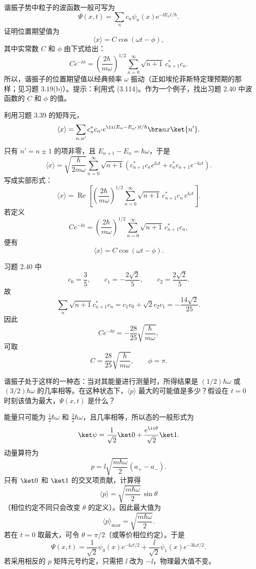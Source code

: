 \begin{question}
谐振子势中粒子的波函数一般可写为
\[
\Psi(x,t)=\sum_n c_n\psi_n(x)\mathrm e^{-\ii E_nt/\hbar}.
\]
证明位置期望值为
\[
\langle x\rangle=C\cos(\omega t-\phi),
\]
其中实常数 $C$ 和 $\phi$ 由下式给出：
\[
Ce^{-\ii\phi}=\left(\frac{2\hbar}{m\omega}\right)^{1/2}
\sum_{n=0}^{\infty}\sqrt{n+1}\,c_{n+1}^*c_n.
\]
所以，谐振子的位置期望值以经典频率 $\omega$ 振动（正如埃伦菲斯特定理预期的那样；见习题 3.19(b)）。提示：利用式 (3.114)。作为一个例子，找出习题 2.40 中波函数的 $C$ 和 $\phi$ 的值。

\par\smallskip
{}

\end{question}
\begin{solution}
利用习题 3.39 的矩阵元，
\[
\langle x\rangle
=\sum_{n,n'}c_n^*c_{n'}e^{\ii(E_n-E_{n'})t/\hbar}\bra n x\ket{n'}.
\]
只有 $n'=n\pm1$ 的项非零，且 $E_{n+1}-E_n=\hbar\omega$，于是
\[
\langle x\rangle=\sqrt{\frac{\hbar}{2m\omega}}
\sum_{n=0}^{\infty}\sqrt{n+1}
\left(c_{n+1}^*c_ne^{\ii\omega t}+c_n^*c_{n+1}e^{-\ii\omega t}\right).
\]
写成实部形式：
\[
\langle x\rangle=\operatorname{Re}\left[
\left(\frac{2\hbar}{m\omega}\right)^{1/2}
\sum_{n=0}^{\infty}\sqrt{n+1}\,c_{n+1}^*c_n\,e^{\ii\omega t}\right].
\]
若定义
\[
Ce^{-\ii\phi}=\left(\frac{2\hbar}{m\omega}\right)^{1/2}
\sum_{n=0}^{\infty}\sqrt{n+1}\,c_{n+1}^*c_n,
\]
便有
\[
\boxed{\langle x\rangle=C\cos(\omega t-\phi).}
\]

习题 2.40 中
\[
c_0=\frac35,
\qquad c_1=-\frac{2\sqrt2}{5},
\qquad c_2=\frac{2\sqrt2}{5}.
\]
故
\[
\sum_n\sqrt{n+1}c_{n+1}^*c_n
=c_1c_0+\sqrt2c_2c_1
=-\frac{14\sqrt2}{25}.
\]
因此
\[
Ce^{-\ii\phi}=-\frac{28}{25}\sqrt{\frac{\hbar}{m\omega}},
\]
可取
\[
\boxed{C=\frac{28}{25}\sqrt{\frac{\hbar}{m\omega}},\qquad \phi=\pi.}
\]
\end{solution}

\begin{question}
谐振子处于这样的一种态：当对其能量进行测量时，所得结果是 $(1/2)\hbar\omega$ 或 $(3/2)\hbar\omega$ 的几率相等。在这种状态下，$\langle p\rangle$ 最大的可能值是多少？假设在 $t=0$ 时刻该值为最大，$\Psi(x,t)$ 是什么？
\end{question}
\begin{solution}
能量只可能为 $\frac12\hbar\omega$ 和 $\frac32\hbar\omega$，且几率相等，所以态的一般形式为
\[
\ket\psi=\frac1{\sqrt2}\ket0+\frac{e^{\ii\theta}}{\sqrt2}\ket1.
\]
动量算符为
\[
p=\ii\sqrt{\frac{m\hbar\omega}{2}}(a_+-a_-).
\]
只有 $\ket0$ 和 $\ket1$ 的交叉项贡献，计算得
\[
\langle p\rangle
=\sqrt{\frac{m\hbar\omega}{2}}\,\sin\theta
\]
（相位约定不同只会改变 $\theta$ 的定义）。因此最大值为
\[
\boxed{\langle p\rangle_{\max}=\sqrt{\frac{m\hbar\omega}{2}}.}
\]
若在 $t=0$ 取最大，可令 $\theta=\pi/2$（或等价相位约定）。于是
\[
\boxed{\Psi(x,t)=\frac1{\sqrt2}\psi_0(x)e^{-\ii\omega t/2}
+\frac{\ii}{\sqrt2}\psi_1(x)e^{-3\ii\omega t/2}.}
\]
若采用相反的 $p$ 矩阵元号约定，只需把 $\ii$ 改为 $-\ii$，物理最大值不变。
\end{solution}

